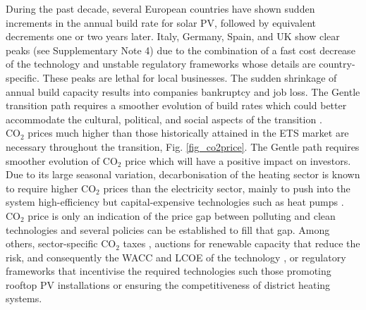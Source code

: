 \documentclass[5p]{elsarticle} %
\begin{document}
During the past decade, several European countries have shown sudden increments in the annual build rate for solar PV, followed by equivalent decrements one or two years later. Italy, Germany, Spain, and UK show clear peaks (see Supplementary Note 4)  due to the combination of a fast cost decrease of the technology and unstable regulatory frameworks whose details are country-specific. These peaks are lethal for local businesses. The sudden shrinkage of annual build capacity results into companies bankruptcy and job loss. The Gentle transition path requires a smoother evolution of build rates which could better accommodate the cultural, political, and social aspects of the transition \cite{Geels_2017}. \\ %

CO$_2$ prices much higher than those historically attained in the ETS market are necessary throughout the transition, Fig. \ref{fig_co2price}. The Gentle path requires smoother evolution of CO$_2$ price which will have a positive impact on investors. Due to its large seasonal variation, decarbonisation of the heating sector is known to require higher CO$_2$ prices than the electricity sector, mainly to push into the system high-efficiency but capital-expensive technologies such as heat pumps \cite{Brown_2018, Victoria_2019_storage}. CO$_2$ price is only an indication of the price gap between polluting and clean technologies and several policies can be established to fill that gap. Among others, sector-specific CO$_2$ taxes \cite{Carbon_pricing_2019}, auctions for renewable capacity that reduce the risk, and consequently the WACC and LCOE of the technology \cite{Vartiainen_2019}, or regulatory frameworks that incentivise the required technologies such those promoting rooftop PV installations or ensuring the competitiveness of district heating systems. %
\end{document}
